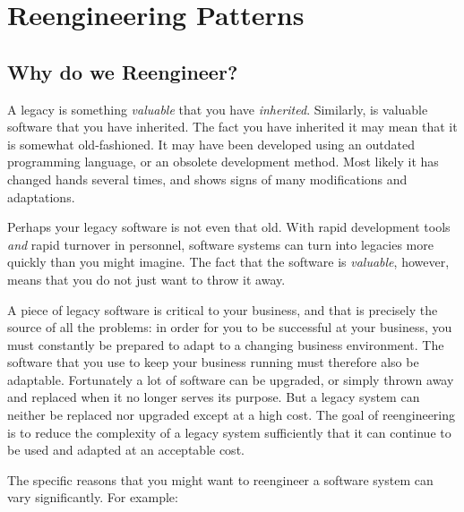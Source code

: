 \documentclass[a4paper,10pt,twoside]{book}
\begin{document}
	\sloppy
\fi
\chapter{Reengineering Patterns}

\section{Why do we Reengineer?}

A legacy is something \emph{valuable} that you have \emph{inherited}. Similarly,  is valuable software that you have inherited. The fact you have inherited it may mean that it is somewhat old-fashioned. It may have been developed using an outdated programming language, or an obsolete development method. Most likely it has changed hands several times, and shows signs of many modifications and adaptations. 

Perhaps your legacy software is not even that old. With rapid development tools \emph{and} rapid turnover in personnel, software systems can turn into legacies more quickly than you might imagine. The fact that the software is \emph{valuable}, however, means that you do not just want to throw it away. 

A piece of legacy software is critical to your business, and that is precisely the source of all the problems: in order for you to be successful at your business, you must constantly be prepared to adapt to a changing business environment. The software that you use to keep your business running must therefore also be adaptable. Fortunately a lot of software can be upgraded, or simply thrown away and replaced when it no longer serves its purpose. But a legacy system can neither be replaced nor upgraded except at a high cost. The goal of reengineering is to reduce the complexity of a legacy system sufficiently that it can continue to be used and adapted at an acceptable cost. 

The specific reasons that you might want to reengineer a software system can vary significantly. For example:
\end{document}
